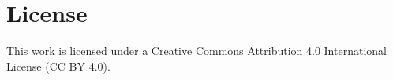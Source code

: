 \documentclass{article}
\begin{document}
\section*{License}
This work is licensed under a Creative Commons Attribution 4.0 International License (CC BY 4.0).
\end{document}

